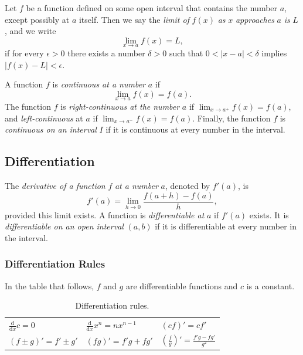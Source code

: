 \documentclass[captions=tableheading]{scrbook}
\begin{document}
\begin{example}
\begin{defn}
Let \(f\) be a function defined on some open interval that contains the number \(a\), except possibly at \(a\) itself. Then we say the \emph{limit of} \(f(x)\) \emph{as} \(x\) \emph{approaches} \(a\) \emph{is} \(L\), and we write 
\begin{equation}
\lim_{x \to a}f(x) = L,
\end{equation}
if for every \(\epsilon > 0\) there exists a number \(\delta > 0\) such that \(0 < |x-a| < \delta\) implies \(|f(x) - L| < \epsilon\).
\end{defn}

\begin{defn}
A function \(f\) is \emph{continuous at a number} \(a\) if 
\begin{equation}
\lim_{x \to a} f(x) = f(a).
\end{equation}
The function \(f\) is \emph{right-continuous at the number} \(a\) if \(\lim_{x\to a^{+}}f(x)=f(a)\), and \emph{left-continuous} at \(a\) if \(\lim_{x\to a^{-}}f(x)=f(a)\). Finally, the function \(f\) is \emph{continuous on an interval} \(I\) if it is continuous at every number in the interval. 
\end{defn}
\subsection{Differentiation}
\label{sec-21-2-2}

\begin{defn}
The \emph{derivative of a function} \(f\) \emph{at a number} \(a\), denoted by \(f'(a)\), is
\begin{equation}
f'(a)=\lim_{h\to0}\frac{f(a+h)-f(a)}{h},
\end{equation}
provided this limit exists.
A function is \emph{differentiable at} \(a\) if \(f'(a)\) exists. It is \emph{differentiable on an open interval} \((a,b)\) if it is differentiable at every number in the interval.
\end{defn}
\subsubsection{Differentiation Rules}
\label{sec-21-2-2-1}

In the table that follows, \(f\) and \(g\) are differentiable functions and \(c\) is a constant.

\begin{table}[htb]
\caption[Differentiation rules]{Differentiation rules.} \label{tab-Differentiation-Rules}
\begin{center}
\begin{tabular}{lll}
 \(\frac{\mathrm{d}}{\mathrm{d} x}c=0\)  &  \(\frac{\mathrm{d}}{\mathrm{d} x}x^{n}=nx^{n-1}\)  &  \((cf)'=cf'\)                                        \\
 \((f\pm g)'=f'\pm g'\)                  &  \((fg)'=f'g+fg'\)                                  &  \(\left(\frac{f}{g}\right)'=\frac{f'g-fg'}{g^{2}}\)  \\
\end{tabular}
\end{center}
\end{table}



\end{example}
\end{document}
